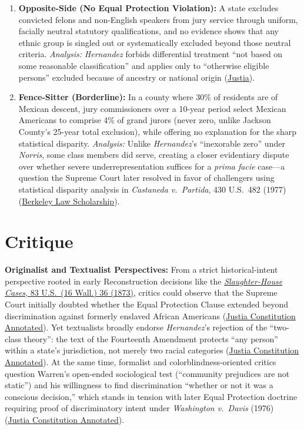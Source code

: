 \documentclass[12pt]{article}
\begin{document}
\begin{enumerate}
\item \textbf{Opposite-Side (No Equal Protection Violation):} A state excludes convicted felons and non-English speakers from jury service through uniform, facially neutral statutory qualifications, and no evidence shows that any ethnic group is singled out or systematically excluded beyond those neutral criteria. \textit{Analysis:} \textit{Hernandez} forbids differential treatment ``not based on some reasonable classification'' and applies only to ``otherwise eligible persons'' excluded because of ancestry or national origin (\href{https://supreme.justia.com/cases/federal/us/347/475/}{Justia}).
\item \textbf{Fence-Sitter (Borderline):} In a county where 30\% of residents are of Mexican descent, jury commissioners over a 10-year period select Mexican Americans to comprise 4\% of grand jurors (never zero, unlike Jackson County's 25-year total exclusion), while offering no explanation for the sharp statistical disparity. \textit{Analysis:} Unlike \textit{Hernandez}'s ``inexorable zero'' under \textit{Norris}, some class members did serve, creating a closer evidentiary dispute over whether severe underrepresentation suffices for a \textit{prima facie} case---a question the Supreme Court later resolved in favor of challengers using statistical disparity analysis in \textit{Castaneda v.\ Partida}, 430 U.S.\ 482 (1977) (\href{https://lawcat.berkeley.edu/record/1116303/files/fulltext.pdf}{Berkeley Law Scholarship}).
\end{enumerate}

\section{Critique}
\textbf{Originalist and Textualist Perspectives:} From a strict historical-intent perspective rooted in early Reconstruction decisions like the \href{https://fedsoc.org/case/the-slaughter-house-cases}{\textit{Slaughter-House Cases}, 83 U.S.\ (16 Wall.) 36 (1873)}, critics could observe that the Supreme Court initially doubted whether the Equal Protection Clause extended beyond discrimination against formerly enslaved African Americans (\href{https://law.justia.com/constitution/us/amendment-14/06-equal-protection-of-the-laws.html}{Justia Constitution Annotated}). Yet textualists broadly endorse \textit{Hernandez}'s rejection of the ``two-class theory'': the text of the Fourteenth Amendment protects ``any person'' within a state's jurisdiction, not merely two racial categories (\href{https://law.justia.com/constitution/us/amendment-14/06-equal-protection-of-the-laws.html}{Justia Constitution Annotated}). At the same time, formalist and colorblindness-oriented critics question Warren's open-ended sociological test (``community prejudices are not static'') and his willingness to find discrimination ``whether or not it was a conscious decision,'' which stands in tension with later Equal Protection doctrine requiring proof of discriminatory intent under \textit{Washington v.\ Davis} (1976) (\href{https://law.justia.com/constitution/us/amendment-14/06-equal-protection-of-the-laws.html}{Justia Constitution Annotated}).
\end{document}
